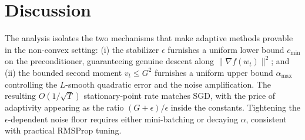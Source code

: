 \documentclass[11pt]{article}
\begin{document}
\section*{Discussion}

The analysis isolates the two mechanisms that make adaptive methods
provable in the non-convex setting: (i) the stabilizer $\epsilon$ furnishes
a uniform lower bound $c_{\min}$ on the preconditioner, guaranteeing genuine
descent along $\|\nabla f(w_t)\|^2$; and (ii) the bounded second moment
$v_t\le G^2$ furnishes a uniform upper bound $\alpha_{\max}$ controlling the
$L$-smooth quadratic error and the noise amplification. The resulting
$O(1/\sqrt T)$ stationary-point rate matches SGD, with the price of
adaptivity appearing as the ratio $(G+\epsilon)/\epsilon$ inside the
constants. Tightening the $\epsilon$-dependent noise floor requires either
mini-batching or decaying $\alpha$, consistent with practical RMSProp
tuning.
\end{document}

